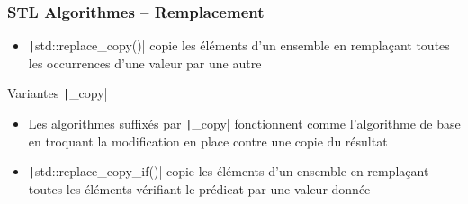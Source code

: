 \documentclass[C++.tex]{subfiles}
\begin{document}
\begin{frame}[fragile]
	\frametitle{STL Algorithmes -- Remplacement}
	\begin{itemize}
		\item \texttt|std::replace_copy()| copie les éléments d'un ensemble en remplaçant toutes les occurrences d'une valeur par une autre
	\end{itemize}

	\begin{block}{Variantes \texttt|_copy|}
		\begin{itemize}
			\item Les algorithmes suffixés par \texttt|_copy| fonctionnent comme l'algorithme de base en troquant la modification en place contre une copie du résultat
		\end{itemize}
	\end{block}

	\begin{itemize}
		\item \texttt|std::replace_copy_if()| copie les éléments d'un ensemble en remplaçant toutes les éléments vérifiant le prédicat par une valeur donnée
	\end{itemize}

\end{frame}
\end{document}
